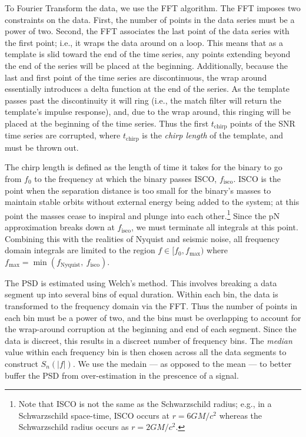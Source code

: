 To Fourier Transform the data, we use the \ac{FFT} algorithm. The \ac{FFT} imposes two constraints on the data. First, the number of points in the data series must be a power of two. Second, the \ac{FFT} associates the last point of the data series with the first point; i.e., it wraps the data around on a loop. This means that as a template is slid toward the end of the time series, any points extending beyond the end of the series will be placed at the beginning. Additionally, because the last and first point of the time series are discontinuous, the wrap around essentially introduces a delta function at the end of the series. As the template passes past the discontinuity it will ring (i.e., the match filter will return the template's impulse response), and, due to the wrap around, this ringing will be placed at the beginning of the time series. Thus the first $t_{\mathrm{chirp}}$ points of the \ac{SNR} time series are corrupted, where $t_{\mathrm{chirp}}$ is the \emph{chirp length} of the template, and must be thrown out.

The chirp length is defined as the length of time it takes for the binary to go from $f_0$ to the frequency at which the binary passes \ac{ISCO}, $f_{\mathrm{isco}}$. \ac{ISCO} is the point when the separation distance is too small for the binary's masses to maintain stable orbits without external energy being added to the system; at this point the masses cease to inspiral and plunge into each other.\footnote{Note that \ac{ISCO} is not the same as the Schwarzschild radius; e.g., in a Schwarzschild space-time, \ac{ISCO} occurs at $r = 6GM/c^2$ whereas the Schwarzschild radius occurs as $r = 2GM/c^2$.} Since the \ac{pN} approximation breaks down at $f_{\mathrm{isco}}$, we must terminate all integrals at this point. Combining this with the realities of Nyquist and seismic noise, all frequency domain integrals are limited to the region $f \in [f_0, f_{\mathrm{max}})$ where $f_{\mathrm{max}} = \min(f_{\mathrm{Nyquist}},~f_{\mathrm{isco}})$.

The \ac{PSD} is estimated using Welch's method. This involves breaking a data segment up into several bins of equal duration. Within each bin, the data is transformed to the frequency domain via the \ac{FFT}. Thus the number of points in each bin must be a power of two, and the bins must be overlapping to account for the wrap-around corruption at the beginning and end of each segment. Since the data is discreet, this results in a discreet number of frequency bins. The \emph{median} value within each frequency bin is then chosen across all the data segments to construct $S_n(|f|)$. We use the medain --- as opposed to the mean --- to better buffer the \ac{PSD} from over-estimation in the prescence of a signal.

